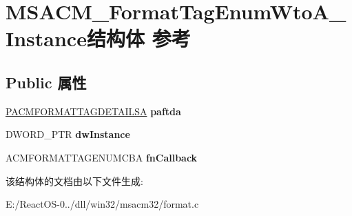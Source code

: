 \hypertarget{struct_m_s_a_c_m___format_tag_enum_wto_a___instance}{}\section{M\+S\+A\+C\+M\+\_\+\+Format\+Tag\+Enum\+Wto\+A\+\_\+\+Instance结构体 参考}
\label{struct_m_s_a_c_m___format_tag_enum_wto_a___instance}
\subsection*{Public 属性}
\begin{DoxyCompactItemize}
\item 
\mbox{\label{struct_m_s_a_c_m___format_tag_enum_wto_a___instance_a7f0907b91a812e6af4659fbacd4d8e11}} 
\hyperlink{struct___a_c_m_f_o_r_m_a_t_t_a_g_d_e_t_a_i_l_s_a}{P\+A\+C\+M\+F\+O\+R\+M\+A\+T\+T\+A\+G\+D\+E\+T\+A\+I\+L\+SA} {\bfseries paftda}
\item 
\mbox{\label{struct_m_s_a_c_m___format_tag_enum_wto_a___instance_a31c29cfe8383925178eeb37da349e3d3}} 
D\+W\+O\+R\+D\+\_\+\+P\+TR {\bfseries dw\+Instance}
\item 
\mbox{\label{struct_m_s_a_c_m___format_tag_enum_wto_a___instance_ad6b220277a1fe6437add83c57632e7b3}} 
A\+C\+M\+F\+O\+R\+M\+A\+T\+T\+A\+G\+E\+N\+U\+M\+C\+BA {\bfseries fn\+Callback}
\end{DoxyCompactItemize}


该结构体的文档由以下文件生成\+:\begin{DoxyCompactItemize}
\item 
E\+:/\+React\+O\+S-\/0../dll/win32/msacm32/format.\+c\end{DoxyCompactItemize}
